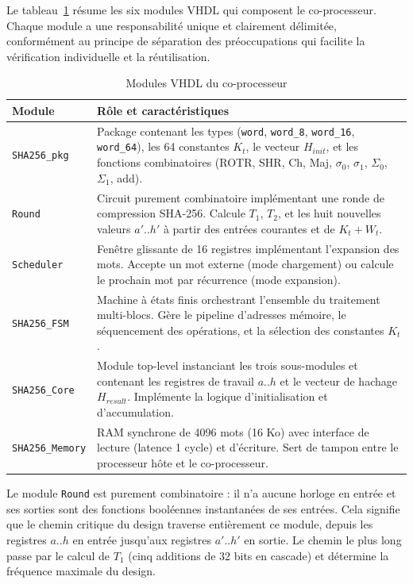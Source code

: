 Le tableau~\ref{tab:modules} résume les six modules VHDL qui composent le co-processeur. Chaque module a une responsabilité unique et clairement délimitée, conformément au principe de séparation des préoccupations qui facilite la vérification individuelle et la réutilisation.

\begin{table}[H]
\centering
\caption{Modules VHDL du co-processeur}
\label{tab:modules}
\begin{tabular}{lp{9cm}}
\toprule
\textbf{Module} & \textbf{Rôle et caractéristiques} \\
\midrule
\texttt{SHA256\_pkg} & Package contenant les types (\texttt{word}, \texttt{word\_8}, \texttt{word\_16}, \texttt{word\_64}), les 64 constantes $K_t$, le vecteur $H_{init}$, et les fonctions combinatoires (ROTR, SHR, Ch, Maj, $\sigma_0$, $\sigma_1$, $\Sigma_0$, $\Sigma_1$, add). \\
\texttt{Round} & Circuit purement combinatoire implémentant une ronde de compression SHA-256. Calcule $T_1$, $T_2$, et les huit nouvelles valeurs $a'..h'$ à partir des entrées courantes et de $K_t + W_t$. \\
\texttt{Scheduler} & Fenêtre glissante de 16 registres implémentant l'expansion des mots. Accepte un mot externe (mode chargement) ou calcule le prochain mot par récurrence (mode expansion). \\
\texttt{SHA256\_FSM} & Machine à états finis orchestrant l'ensemble du traitement multi-blocs. Gère le pipeline d'adresses mémoire, le séquencement des opérations, et la sélection des constantes $K_t$. \\
\texttt{SHA256\_Core} & Module top-level instanciant les trois sous-modules et contenant les registres de travail $a..h$ et le vecteur de hachage $H_{result}$. Implémente la logique d'initialisation et d'accumulation. \\
\texttt{SHA256\_Memory} & RAM synchrone de 4096 mots (16 Ko) avec interface de lecture (latence 1 cycle) et d'écriture. Sert de tampon entre le processeur hôte et le co-processeur. \\
\bottomrule
\end{tabular}
\end{table}

Le module \texttt{Round} est purement combinatoire : il n'a aucune horloge en entrée et ses sorties sont des fonctions booléennes instantanées de ses entrées. Cela signifie que le chemin critique du design traverse entièrement ce module, depuis les registres $a..h$ en entrée jusqu'aux registres $a'..h'$ en sortie. Le chemin le plus long passe par le calcul de $T_1$ (cinq additions de 32 bits en cascade) et détermine la fréquence maximale du design.

